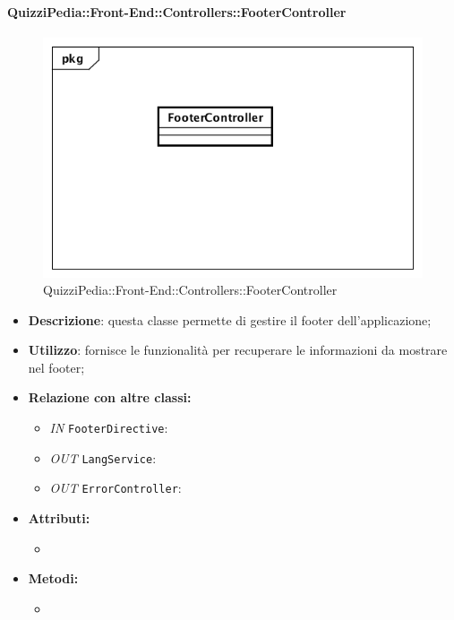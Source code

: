 \paragraph{QuizziPedia::Front-End::Controllers::FooterController}
\begin{figure}
	\centering
	\includegraphics[scale=0.45]{UML/Classi/Front-End/QuizziPedia_Front-end_Controller_FooterController.png}
	\caption{QuizziPedia::Front-End::Controllers::FooterController}
\end{figure}
\begin{itemize}
	\item \textbf{Descrizione}: questa classe permette di gestire il footer dell'applicazione;
	\item \textbf{Utilizzo}: fornisce le funzionalità per recuperare le informazioni da mostrare nel footer;
	\item \textbf{Relazione con altre classi:}
	\begin{itemize}
		\item \textit{IN} \texttt{FooterDirective}:  
		\item \textit{OUT} \texttt{LangService}: 
		\item \textit{OUT} \texttt{ErrorController}: 
	\end{itemize}
	\item \textbf{Attributi:}
	\begin{itemize}
		\item 
	\end{itemize}
	\item \textbf{Metodi:}
	\begin{itemize}
		\item 
	\end{itemize}
\end{itemize}

